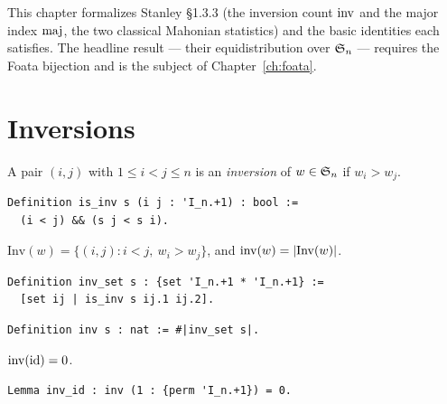 This chapter formalizes Stanley \S1.3.3 (the inversion count $\mathrm{inv}$
and the major index $\mathrm{maj}$, the two classical Mahonian statistics)
and the basic identities each satisfies. The headline result
--- their equidistribution over $\mathfrak{S}_{n}$ --- requires the Foata
bijection and is the subject of Chapter~\ref{ch:foata}.

\section{Inversions}

\begin{definition}[Inversion]
  \label{def:is_inv}
  A pair $(i, j)$ with $1 \leq i < j \leq n$ is an
  \emph{inversion} of $w \in \mathfrak{S}_{n}$ if $w_i > w_j$.
\end{definition}

\begin{lstlisting}[language=Rocq]
Definition is_inv s (i j : 'I_n.+1) : bool :=
  (i < j) && (s j < s i).
\end{lstlisting}


\begin{definition}
  \label{def:inv}
  $\mathrm{Inv}(w) = \{(i, j) : i < j,\ w_i > w_j\}$, and
  $\mathrm{inv}(w) = |\mathrm{Inv}(w)|$.
\end{definition}

\begin{lstlisting}[language=Rocq]
Definition inv_set s : {set 'I_n.+1 * 'I_n.+1} :=
  [set ij | is_inv s ij.1 ij.2].
\end{lstlisting}

\begin{lstlisting}[language=Rocq]
Definition inv s : nat := #|inv_set s|.
\end{lstlisting}

\begin{lemma}
  $\mathrm{inv}(\mathrm{id}) = 0$.
\end{lemma}

\begin{lstlisting}[language=Rocq]
Lemma inv_id : inv (1 : {perm 'I_n.+1}) = 0.
\end{lstlisting}

